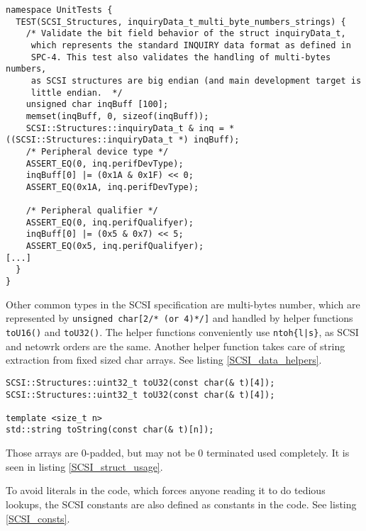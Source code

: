 \begin{table}
\begin{lstlisting}[caption=SCSI::Structures usage example,label=SCSI_struct_testing]
namespace UnitTests {
  TEST(SCSI_Structures, inquiryData_t_multi_byte_numbers_strings) {
    /* Validate the bit field behavior of the struct inquiryData_t,
     which represents the standard INQUIRY data format as defined in 
     SPC-4. This test also validates the handling of multi-bytes numbers,
     as SCSI structures are big endian (and main development target is 
     little endian.  */
    unsigned char inqBuff [100];
    memset(inqBuff, 0, sizeof(inqBuff));
    SCSI::Structures::inquiryData_t & inq = *((SCSI::Structures::inquiryData_t *) inqBuff);
    /* Peripheral device type */
    ASSERT_EQ(0, inq.perifDevType);
    inqBuff[0] |= (0x1A & 0x1F) << 0;
    ASSERT_EQ(0x1A, inq.perifDevType);
    
    /* Peripheral qualifier */
    ASSERT_EQ(0, inq.perifQualifyer);
    inqBuff[0] |= (0x5 & 0x7) << 5;
    ASSERT_EQ(0x5, inq.perifQualifyer);
[...]
  }
}
\end{lstlisting}
\end{table}

Other common types in the SCSI specification are multi-bytes
number, which are represented by \verb#unsigned char[2/* (or 4)*/]# and handled by helper functions 
\verb#toU16()# and \verb#toU32()#. The helper functions
conveniently use \verb#ntoh{l|s}#, as SCSI and netowrk orders are the same. Another helper function 
takes care of string extraction from fixed sized char arrays. See listing \ref{SCSI_data_helpers}.

\begin{table}
\begin{lstlisting}[caption=SCSI::Structures helper functions,label=SCSI_data_helpers]
SCSI::Structures::uint32_t toU32(const char(& t)[4]);
SCSI::Structures::uint32_t toU32(const char(& t)[4]);

template <size_t n>
std::string toString(const char(& t)[n]);
\end{lstlisting}
\end{table}

Those arrays are 0-padded, but may not be 0 terminated used completely. It is seen in listing \ref{SCSI_struct_usage}.

To avoid literals in the code, which forces anyone reading it to do tedious lookups,
the SCSI constants are also defined as constants in the code. See listing \ref{SCSI_consts}.

